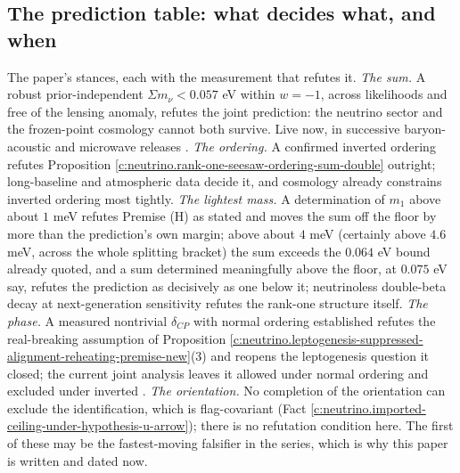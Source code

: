\documentclass[11pt]{article}
\theoremstyle{definition}
\theoremstyle{plain}
\providecommand{\mnu}{}\renewcommand{\mnu}{\Sigma m_{\nu}}
\begin{document}
\subsection*{The prediction table: what decides what, and when}
\label{c:note.neutrino.setting-prediction-table-what-decides-what}
The paper's stances, each with the measurement that refutes it. \emph{The sum.} A robust prior-independent $\mnu < 0.057$ eV within $w = -1$, across likelihoods and free of the lensing anomaly, refutes the joint prediction: the neutrino sector and the frozen-point cosmology cannot both survive. Live now, in successive baryon-acoustic and microwave releases \cite{DESI2025, HouWangZhaoZhang2026}. \emph{The ordering.} A confirmed inverted ordering refutes Proposition \ref{c:neutrino.rank-one-seesaw-ordering-sum-double} outright; long-baseline and atmospheric data decide it, and cosmology already constrains inverted ordering most tightly. \emph{The lightest mass.} A determination of $m_{1}$ above about $1$ meV refutes Premise (H) as stated and moves the sum off the floor by more than the prediction's own margin; above about $4$ meV (certainly above $4.6$ meV, across the whole splitting bracket) the sum exceeds the $0.064$ eV bound already quoted, and a sum determined meaningfully above the floor, at $0.075$ eV say, refutes the prediction as decisively as one below it; neutrinoless double-beta decay at next-generation sensitivity refutes the rank-one structure itself. \emph{The phase.} A measured nontrivial $\delta_{CP}$ with normal ordering established refutes the real-breaking assumption of Proposition \ref{c:neutrino.leptogenesis-suppressed-alignment-reheating-premise-new}(3) and reopens the leptogenesis question it closed; the current joint analysis leaves it allowed under normal ordering and excluded under inverted \cite{T2KNOvA2025}. \emph{The orientation.} No completion of the orientation can exclude the identification, which is flag-covariant (Fact \ref{c:neutrino.imported-ceiling-under-hypothesis-u-arrow}); there is no refutation condition here. The first of these may be the fastest-moving falsifier in the series, which is why this paper is written and dated now.
\end{document}
